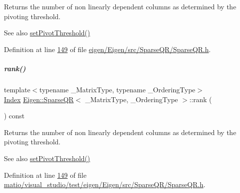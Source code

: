 \begin{DoxyReturn}{Returns}
the number of non linearly dependent columns as determined by the pivoting threshold.
\end{DoxyReturn}
\begin{DoxySeeAlso}{See also}
\hyperlink{group___sparse_q_r___module_adb7bfa65f99e3ef91ed58ea663a850a1}{set\+Pivot\+Threshold()} 
\end{DoxySeeAlso}


Definition at line \hyperlink{eigen_2_eigen_2src_2_sparse_q_r_2_sparse_q_r_8h_source_l00149}{149} of file \hyperlink{eigen_2_eigen_2src_2_sparse_q_r_2_sparse_q_r_8h_source}{eigen/\+Eigen/src/\+Sparse\+Q\+R/\+Sparse\+Q\+R.\+h}.

\mbox{\label{group___sparse_q_r___module_a70ec2b9e5cb62a41dc1ee2adfb54e9b0}} 
\subparagraph{\texorpdfstring{rank()}{rank()}\hspace{0.1cm}{\footnotesize\ttfamily [2/2]}}
{\footnotesize\ttfamily template$<$typename \+\_\+\+Matrix\+Type, typename \+\_\+\+Ordering\+Type$>$ \\
\hyperlink{namespace_eigen_a62e77e0933482dafde8fe197d9a2cfde}{Index} \hyperlink{group___sparse_q_r___module_class_eigen_1_1_sparse_q_r}{Eigen\+::\+Sparse\+QR}$<$ \+\_\+\+Matrix\+Type, \+\_\+\+Ordering\+Type $>$\+::rank (\begin{DoxyParamCaption}{ }\end{DoxyParamCaption}) const\hspace{0.3cm}{\ttfamily [inline]}}

\begin{DoxyReturn}{Returns}
the number of non linearly dependent columns as determined by the pivoting threshold.
\end{DoxyReturn}
\begin{DoxySeeAlso}{See also}
\hyperlink{group___sparse_q_r___module_adb7bfa65f99e3ef91ed58ea663a850a1}{set\+Pivot\+Threshold()} 
\end{DoxySeeAlso}


Definition at line \hyperlink{matio_2visual__studio_2test_2eigen_2_eigen_2src_2_sparse_q_r_2_sparse_q_r_8h_source_l00149}{149} of file \hyperlink{matio_2visual__studio_2test_2eigen_2_eigen_2src_2_sparse_q_r_2_sparse_q_r_8h_source}{matio/visual\+\_\+studio/test/eigen/\+Eigen/src/\+Sparse\+Q\+R/\+Sparse\+Q\+R.\+h}.

